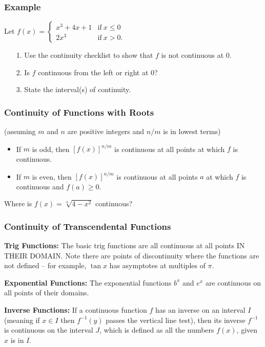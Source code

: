 \documentclass[14pt]{beamer}
\begin{document}
\begin{frame}
\frametitle{Example}
Let $f(x)=
\begin{cases}
x^3+4x+1 & \text{if}\ x \leq 0 \\
2x^3 & \text{if}\ x>0.
\end{cases}$

\vspace{1pc}
\begin{itemize}
\item[1.] Use the continuity checklist to show that $f$ is not continuous at 0.

\vspace{0.5pc}
\item[2.] Is $f$ continuous from the left or right at 0?

\vspace{0.5pc}
\item[3.] State the interval(s) of continuity.
\end{itemize}
\end{frame}

\begin{frame}
\frametitle{Continuity of Functions with Roots}
\small
(assuming $m$ and $n$ are positive integers and $n/m$ is in lowest terms)

\vspace{0.5pc}
\begin{itemize}
\small
\item If $m$ is odd, then $[f(x)]^{n/m}$ is continuous at all points at which $f$ is continuous.

\vspace{0.5pc}
\item If $m$ is even, then $[f(x)]^{n/m}$ is continuous at all points $a$ at which $f$ is continuous \alert{and $f(a)\geq 0$}.
\end{itemize}
\begin{que}  Where is $f(x)=\sqrt[4]{4-x^2}$ continuous?\end{que}
\end{frame}

\begin{frame}
\frametitle{Continuity of Transcendental Functions}
\footnotesize
{\bf Trig Functions:} The basic trig functions are all continuous at all points \alert{IN THEIR DOMAIN}.  Note there are points of discontinuity where the functions are not defined -- for example, $\tan x$ has asymptotes at multiples of $\pi$.

\vspace{1pc}
{\bf Exponential Functions:}  The exponential functions $b^x$ and $e^x$ are continuous on all points of their domains.

\vspace{1pc}
{\bf Inverse Functions:}  If a continuous function $f$ has an inverse on an interval $I$ (meaning if $x\in I$ then $f^{-1}(y)$ passes the vertical line test), then its inverse $f^{-1}$ is continuous on the interval $J$, which is defined as all the numbers $f(x)$, given $x$ is in $I$.
\end{frame}
\end{document}
